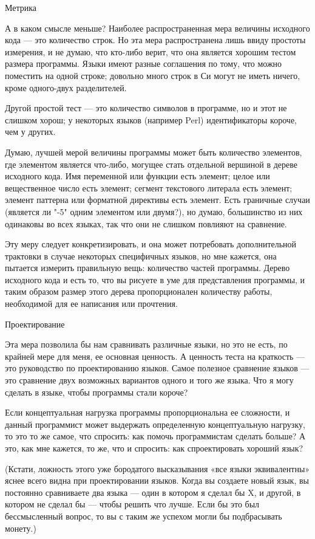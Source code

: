 \documentclass[ebook,12pt,oneside,openany]{memoir}
\begin{document}
Метрика

А в каком смысле меньше? Наиболее распространенная мера величины
исходного кода — это количество строк. Но эта мера распространена лишь
ввиду простоты измерения, и не думаю, что кто-либо верит, что она
является хорошим тестом размера программы. Языки имеют разные
соглашения по тому, что можно поместить на одной строке; довольно
много строк в Си могут не иметь ничего, кроме одного-двух
разделителей.

Другой простой тест — это количество символов в программе, но и этот
не слишком хорош; у некоторых языков (например Perl) идентификаторы
короче, чем у других.

Думаю, лучшей мерой величины программы может быть количество
элементов, где элементом является что-либо, могущее стать отдельной
вершиной в дереве исходного кода. Имя переменной или функции есть
элемент; целое или вещественное число есть элемент; сегмент текстового
литерала есть элемент; элемент паттерна или форматной директивы есть
элемент. Есть граничные случаи (является ли "-5" одним элементом или
двумя?), но думаю, большинство из них одинаковы во всех языках, так
что они не слишком повлияют на сравнение.

Эту меру следует конкретизировать, и она может потребовать
дополнительной трактовки в случае некоторых специфичных языков, но мне
кажется, она пытается измерить правильную вещь: количество частей
программы. Дерево исходного кода и есть то, что вы рисуете в уме для
представления программы, и таким образом размер этого дерева
пропорционален количеству работы, необходимой для ее написания или
прочтения.

Проектирование

Эта мера позволила бы нам сравнивать различные языки, но это не есть,
по крайней мере для меня, ее основная ценность. А ценность теста на
краткость — это руководство по проектированию языков. Самое полезное
сравнение языков — это сравнение двух возможных вариантов одного и
того же языка. Что я могу сделать в языке, чтобы программы стали
короче?

Если концептуальная нагрузка программы пропорциональна ее сложности, и
данный программист может выдержать определенную концептуальную
нагрузку, то это то же самое, что спросить: как помочь программистам
сделать больше? А это, как мне кажется, то же, что и спросить: как
спроектировать хороший язык?

(Кстати, ложность этого уже бородатого высказывания «все языки
эквивалентны» яснее всего видна при проектировании языков. Когда вы
создаете новый язык, вы постоянно сравниваете два языка — один в
котором я сделал бы X, и другой, в котором не сделал бы — чтобы решить
что лучше. Если бы это был бессмысленный вопрос, то вы с таким же
успехом могли бы подбрасывать монету.)
\end{document}
